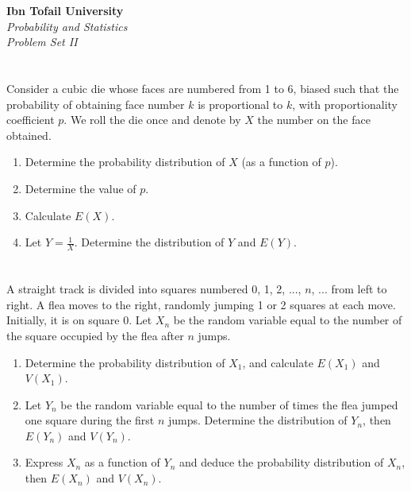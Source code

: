 \documentclass[12pt]{article}
\begin{document}
\begin{center}
\Large\textbf{Ibn Tofail University} \\[1em]
\large\textit{Probability and Statistics} \\[2em]
\large\textit{Problem Set II} \\[0.5em]
\end{center}

\vspace{1cm}

\section{}
Consider a cubic die whose faces are numbered from 1 to 6, biased such that the probability of obtaining face number \( k \) is proportional to \( k \), with proportionality coefficient \( p \). We roll the die once and denote by \( X \) the number on the face obtained.
\begin{enumerate}
    \item Determine the probability distribution of \( X \) (as a function of \( p \)).
    \item Determine the value of \( p \).
    \item Calculate \( E(X) \).
    \item Let \( Y = \frac{1}{X} \). Determine the distribution of \( Y \) and \( E(Y) \).
\end{enumerate}

\begin{correctionbox}

\end{correctionbox}

\section{}
A straight track is divided into squares numbered 0, 1, 2, ..., \( n \), ... from left to right. A flea moves to the right, randomly jumping 1 or 2 squares at each move. Initially, it is on square 0. Let \( X_n \) be the random variable equal to the number of the square occupied by the flea after \( n \) jumps.
\begin{enumerate}
    \item Determine the probability distribution of \( X_1 \), and calculate \( E(X_1) \) and \( V(X_1) \).
    \item Let \( Y_n \) be the random variable equal to the number of times the flea jumped one square during the first \( n \) jumps. Determine the distribution of \( Y_n \), then \( E(Y_n) \) and \( V(Y_n) \).
    \item Express \( X_n \) as a function of \( Y_n \) and deduce the probability distribution of \( X_n \), then \( E(X_n) \) and \( V(X_n) \).
\end{enumerate}
\end{document}

